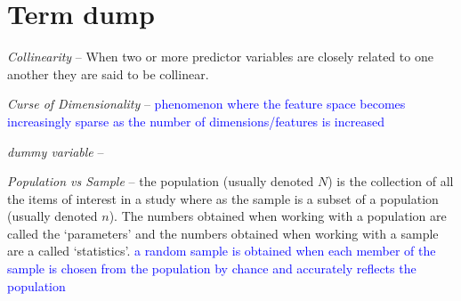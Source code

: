 \chapter{Term dump}

\emph{Collinearity} -- When two or more predictor variables are closely related to one another they are said to be collinear.

\emph{Curse of Dimensionality} -- \textcolor{blue}{phenomenon where the feature space becomes increasingly sparse as the number of dimensions/features is increased}

\emph{dummy variable} --


\emph{Population vs Sample} -- the population (usually denoted $N$) is the collection of all the items of interest in a study where as the sample is a subset of a population (usually denoted $n$). The numbers obtained when working with a population are called the `parameters' and the numbers obtained when working with a sample are a called `statistics'. \textcolor{blue}{a random sample is obtained when each member of the sample is chosen from the population by chance and accurately reflects the population}